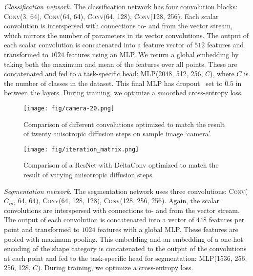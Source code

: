 \documentclass[acmtog, authorversion]{acmart}
\begin{document}
\emph{Classification network.} The classification network has four convolution blocks: \textsc{Conv}(3, 64), \textsc{Conv}(64, 64), \textsc{Conv}(64, 128),  \textsc{Conv}(128, 256). Each scalar convolution is interspersed with connections to- and from the vector stream, which mirrors the number of parameters in its vector convolutions. The output of each scalar convolution is concatenated into a feature vector of $512$ features and transformed to $1024$ features using an MLP. We return a global embedding by taking both the maximum and mean of the features over all points. These are concatenated and fed to a task-specific head: \textsc{MLP}(2048, 512, 256, $C$), where $C$ is the number of classes in the dataset. This final MLP has dropout~\cite{dropout2014} set to $0.5$ in between the layers. During training, we optimize a smoothed cross-entropy loss.

\begin{figure}
    \centering
    \texttt{[image: fig/camera-20.png]}
    \caption{Comparison of different convolutions optimized to match the result of twenty anisotropic diffusion steps on sample image `camera'.}
    \label{fig:peronamalik_camera}
\end{figure}

\begin{figure}
    \centering
    \texttt{[image: fig/iteration\_matrix.png]}
    \caption{Comparison of a ResNet with DeltaConv optimized to match the result of varying anisotropic diffusion steps.}
    \label{fig:peronamalik_nsteps}
\end{figure}

\emph{Segmentation network.} The segmentation network uses three convolutions: \textsc{Conv}($C_{in}$, 64, 64), \textsc{Conv}(64, 128, 128),
\textsc{Conv}(128, 256, 256). Again, the scalar convolutions are interspersed with connections to- and from the vector stream. The output of each convolution is concatenated into a vector of $448$ features per point and transformed to $1024$ features with a global MLP. These features are pooled with maximum pooling. This embedding and an embedding of a one-hot encoding of the shape category is concatenated to the output of the convolutions at each point and fed to the task-specific head for segmentation: \textsc{MLP}(1536, 256, 256, 128, $C$). During training, we optimize a cross-entropy loss.
\end{document}

